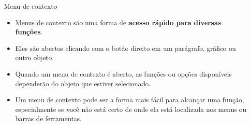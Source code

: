 \begin{frame}{Menu de contexto}
	\begin{block}{}
		\begin{itemize}
			\item Menus de contexto são uma forma de \textbf{acesso rápido para diversas funções}.
			\item Eles são abertos clicando com o botão direito em um parágrafo, gráfico ou outro objeto.
			\item Quando um menu de contexto é aberto, as funções ou opções disponíveis dependerão do objeto que estiver selecionado.
			\item Um menu de contexto pode ser a forma mais fácil para alcançar uma função, especialmente se você não está certo de onde ela está localizada nos menus ou barras de ferramentas.
		\end{itemize}
	\end{block}
\end{frame}


